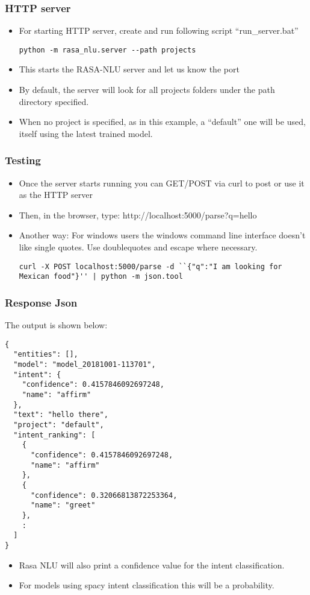  \begin{frame}[fragile]\frametitle{HTTP server}
\begin{itemize}
\item For starting HTTP server, create and run following script ``run\_server.bat''
\begin{lstlisting}
python -m rasa_nlu.server --path projects
\end{lstlisting}
\item This starts the RASA-NLU server and let us know the port
\item By default, the server will look for all projects folders under the path directory specified. 
\item When no project is specified, as in this example, a ``default'' one will be used, itself using the latest trained model.
\end{itemize}
\end{frame}



 \begin{frame}[fragile]\frametitle{Testing}
\begin{itemize}
\item Once the server starts running you can GET/POST via curl to post or use it as the HTTP server
\item Then, in the browser, type: http://localhost:5000/parse?q=hello%
\item Another way: For windows users the windows command line interface doesn’t like single quotes. Use doublequotes and escape where necessary.
\begin{lstlisting}
curl -X POST localhost:5000/parse -d ``{"q":"I am looking for Mexican food"}'' | python -m json.tool
\end{lstlisting}
\end{itemize}
\end{frame}

 \begin{frame}[fragile]\frametitle{Response Json}
The output is shown below:
\scriptsize
\begin{lstlisting}
{
  "entities": [],
  "model": "model_20181001-113701",
  "intent": {
    "confidence": 0.4157846092697248,
    "name": "affirm"
  },
  "text": "hello there",
  "project": "default",
  "intent_ranking": [
    {
      "confidence": 0.4157846092697248,
      "name": "affirm"
    },
    {
      "confidence": 0.32066813872253364,
      "name": "greet"
    },
    :
  ]
}
\end{lstlisting}
\begin{itemize}
\item Rasa NLU will also print a confidence value for the intent classification. 
\item For models using spacy intent classification this will be a probability.
\end{itemize}
\end{frame}

